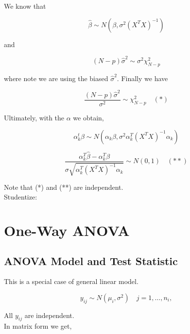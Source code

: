 \documentclass[11pt,fleqn]{book} %
\begin{document}
We know that 

	$$\hat{\beta} \sim N(\beta, \sigma^2 (X^TX)^{-1}) $$

and

	$$ (N-p) \hat{\sigma}^2 \sim \sigma^2 \chi^2_{N-p}$$

where note we are using the biased $\hat{\sigma}^2$. Finally we have

		$$\frac{(N-p)\hat{\sigma}^2}{\sigma^2} \sim \chi^2_{N-p} \quad (*)$$

Ultimately, with the $\alpha$ we obtain, 

		$$\alpha_k^t \hat{\beta} \sim N(\alpha_k \beta, \sigma^2 \alpha_k^T(X^TX)^{-1}\alpha_k)  $$

		$$\frac{\alpha_k^T \hat{\beta} - \alpha_k^T \beta}{\sigma \sqrt{\alpha_k^T(X^TX)^{-1}\alpha_k}} \sim N(0,1) \quad (**)$$

Note that (*) and (**) are independent. \\

Studentize: 





\chapter{One-Way ANOVA}

\section{ANOVA Model and Test Statistic}

This is a special case of general linear model. 

	$$y_{ij} \sim N(\mu_i, \sigma^2) \quad j = 1, \dots, n_i,  $$

All $y_{ij}$ are independent. \\

In matrix form we get,
\end{document}
